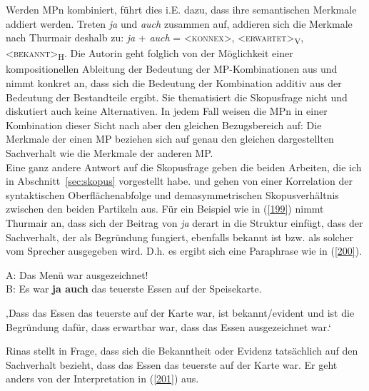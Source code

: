Werden MPn kombiniert, führt dies i.E. dazu, dass ihre semantischen Merkmale  addiert werden. Treten \textit{ja} und \textit{auch} zusammen auf, addieren sich die Merkmale nach Thurmair deshalb zu: \textit{ja} + \textit{auch} = \textless \textsc{konnex}\textgreater, \textless\textrm{\textsc{erwartet}}\textgreater\textsubscript{V}, \textless\textrm{\textsc{bekannt}}\textgreater\textsubscript{H}. Die Autorin geht folglich von der Möglichkeit einer kompositionellen Ableitung der Bedeutung der MP-Kom\-bi\-na\-ti\-on\-en aus und nimmt konkret an, dass sich die Bedeutung der Kombination additiv aus der Bedeutung der Bestandteile ergibt. Sie thematisiert die Skopusfrage nicht und diskutiert auch keine Alternativen. In jedem Fall weisen die MPn in einer Kombination dieser Sicht nach aber den glei\-chen Bezugsbereich auf: Die Merkmale der einen MP beziehen sich auf genau den gleichen dargestellten Sachverhalt wie die Merkmale der anderen MP.\\

\noindent
Eine ganz andere Antwort auf die Skopusfrage  geben die beiden Arbeiten, die ich in Abschnitt~\ref{sec:skopus} vorgestellt habe. \citet{Ormelius-Sandblom1997} und \citet{Rinas2007} gehen von einer Korrelation der syntaktischen Oberflächenabfolge und dem\linebreak asymmetrischen Skopusverhältnis zwischen den beiden Partikeln aus. Für ein Beispiel wie in (\ref{199}) nimmt Thurmair an, dass sich der Beitrag von \textit{ja} derart in die Struktur einfügt, dass der Sachverhalt, der als Begründung fungiert, ebenfalls bekannt ist bzw. als solcher vom Sprecher ausgegeben wird. D.h. es ergibt sich eine Paraphrase wie in (\ref{200}).

\begin{exe}
	\ex\label{199} 
	A: Das Menü war ausgezeichnet!\\
	B: Es war \textbf{ja auch} das teuerste Essen auf der Speisekarte.\\
	\hbox{}\hfill\hbox{\citet[424]{Rinas2007}}
\end{exe}	

\begin{exe}
	\ex\label{200} 
	‚Dass das Essen das teuerste auf der Karte war, ist bekannt/evident und ist die Begründung dafür, dass erwartbar war, dass das Essen ausgezeichnet 	war.‘
\end{exe}
Rinas stellt in Frage, dass sich die Bekanntheit oder Evidenz tatsächlich auf den Sachverhalt bezieht, dass das Essen das teuerste auf der Karte war. Er geht anders von der Interpretation in (\ref{201}) aus.

